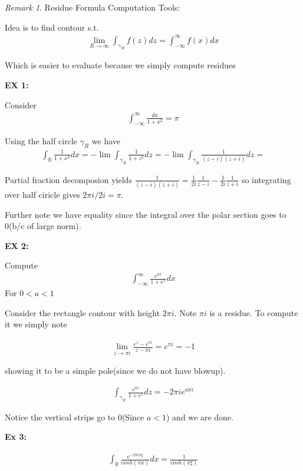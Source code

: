 \documentclass[11pt]{article}
\newcommand{\R}{\mathbb{R}}
\theoremstyle{remark}
\newtheorem{remark}{Remark}
\begin{document}
\begin{remark}Residue Formula Computation Tools:

Idea is to find contour s.t.
\begin{align*}
	\lim_{R \to \infty} \int_{\gamma_R} f(z)dz = \int_{-\infty}^{\infty}f(x)dx
\end{align*}

Which is easier to evaluate because we simply compute residues

\textbf{EX 1:}

Consider
\begin{align*}
	\int_{-\infty}^{\infty}\frac{dx}{1+x^2} = \pi 
\end{align*}

Using the half circle $\gamma_R$ we have
\begin{align*}
	\int_{\R}\frac{1}{1+x^2}dx = -\lim \int_{\gamma_R}\frac{1}{1+z^2}dz = -\lim \int_{\gamma_R}\frac{1}{(z-i)(z+i)}dz = 
\end{align*}

Partial fraction decomposion yields $\frac{1}{(z-i)(z+i)} = \frac{1}{2i}\frac{1}{z-i} - \frac{1}{2i}\frac{1}{z+i}$ so integrating over half ciricle gives $2\pi i/2 i = \pi$. 

Further note we have equality since the integral over the polar section goes to 0(b/c of large norm). 

\textbf{EX 2:}

Compute
\begin{align*}
	\int_{-\infty}^{\infty}\frac{e^{ax}}{1+e^x}dx
\end{align*}
For $0 < a < 1$

Consider the rectangle contour with height $2 \pi i$. Note $\pi i$ is a residue. To compute it we simply note

\begin{align*}
	\lim_{z \to \pi i} \frac{e^z - e^{\pi i}}{z - \pi i} = e^{\pi i} = -1
\end{align*}

showing it to be a simple pole(since we do not have blowup). 

\begin{align*}
	\int_{\gamma_R}\frac{e^{az}}{1+e^z}dz  = - 2\pi i e^{a \pi i} 
\end{align*}

Notice the vertical strips go to 0(Since $a < 1$) and we are done. 

\textbf{Ex 3:}

\begin{align*}
	\int_{\R} \frac{e^{-2\pi i x \xi}}{cosh(\pi x)}dx = \frac{1}{cosh(\pi \xi)}
\end{align*}


\end{remark}
\end{document}
